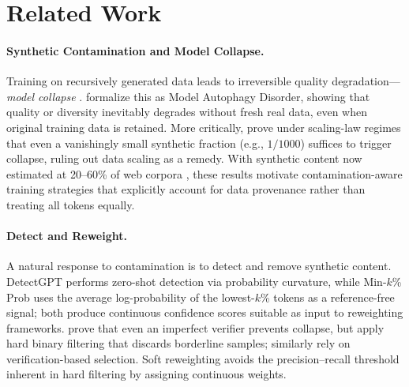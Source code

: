 
\section{Related Work}
\label{sec:related}

\paragraph{Synthetic Contamination and Model Collapse.}
Training on recursively generated data leads to irreversible quality degradation---\emph{model collapse} \citep{shumailov2024model}.
\cite{alemohammad2024mad} formalize this as Model Autophagy Disorder, showing that quality or diversity inevitably degrades without fresh real data, even when original training data is retained.
More critically, \cite{dohmatob2025strong} prove under scaling-law regimes that even a vanishingly small synthetic fraction (e.g., $1/1000$) suffices to trigger collapse, ruling out data scaling as a remedy.
With synthetic content now estimated at 20--60\% of web corpora \citep{cheng2025contamination}, these results motivate contamination-aware training strategies that explicitly account for data provenance rather than treating all tokens equally.

\paragraph{Detect and Reweight.}
A natural response to contamination is to detect and remove synthetic content.
DetectGPT \citep{mitchell2023detectgpt} performs zero-shot detection via probability curvature, while Min-$k$\% Prob \citep{shi2024minkprob} uses the average log-probability of the lowest-$k$\% tokens as a reference-free signal; both produce continuous confidence scores suitable as input to reweighting frameworks.
\cite{feng2025beyond} prove that even an imperfect verifier prevents collapse, but apply hard binary filtering that discards borderline samples; \cite{guo2025escaping} similarly rely on verification-based selection.
Soft reweighting avoids the precision--recall threshold inherent in hard filtering by assigning continuous weights.

